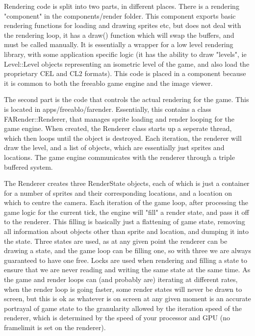 \documentclass[a4paper]{article}
\begin{document}
    Rendering code is split into two parts, in different places. There is a rendering "component" in the components/render folder.
    This component exports basic rendering functions for loading and drawing sprites etc, but does not deal with the rendering loop, it has a draw() function which will swap the buffers, and must be called manually.   
    It is essentially a wrapper for a low level rendering library, with some application specific logic (it has the ability to draw "levels", ie Level::Level objects representing an isometric level of the game, and also load the proprietary CEL and CL2 formats).
    This code is placed in a component because it is common to both the freeablo game engine and the image viewer.
    
    \mbox{}
    
    The second part is the code that controls the actual rendering for the game. This is located in apps/freeablo/farender. Essentially, this contains a class FARender::Renderer, that manages sprite loading and render looping for the game engine.  
    When created, the Renderer class starts up a seperate thread, which then loops until the object is destroyed. Each iteration, the renderer will draw the level, and a list of objects, which are essentially just sprites and locations.
    The game engine communicates with the renderer through a triple buffered system.
    
    The Renderer creates three RenderState objects, each of which is just a container for a number of sprites and their corresponding locations, and a location on which to centre the camera.
    Each iteration of the game loop, after processing the game logic for the current tick, the engine will "fill" a render state, and pass it off to the renderer. This filling is basically just a flattening of game state, removing all information about objects other than sprite and location, and dumping it into the state.
    Three states are used, as at any given point the renderer can be drawing a state, and the game loop can be filling one, so with three we are always guaranteed to have one free.
    Locks are used when rendering and filling a state to ensure that we are never reading and writing the same state at the same time.
    As the game and render loops can (and probably are) iterating at different rates, when the render loop is going faster, some render states will never be drawn to screen, but this is ok as whatever is on screen at any given moment is an accurate portrayal of game state to the granularity allowed by the iteration speed of the renderer, which is determined by the speed of your processor and GPU (no framelimit is set on the renderer).
    
\end{document}
